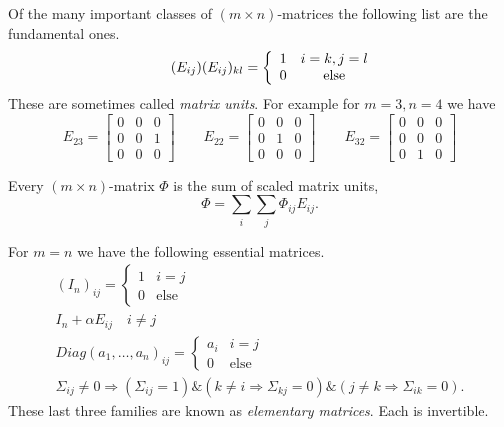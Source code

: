 \documentclass[12pt,twoside,dvipsnames,letterpaper]{memoir}
\begin{document}
Of the many important classes of $(m\times n)$-matrices the following list are the fundamental ones.
\begin{gather}
    \tag{$E_{ij}$}
    (E_{ij})_{kl}  = \left\{\begin{array}{cc}
        1 & i=k, j=l\\
        0 & \text{else}
    \end{array}\right.\\
\end{gather}
These are sometimes called \emph{matrix units}.
For example for $m=3,n=4$ we have
\[
    E_{23}=\begin{bmatrix} 0 & 0 & 0 \\ 0 & 0 & 1 \\ 0 & 0 & 0 \end{bmatrix}
    \qquad
    E_{22}=\begin{bmatrix} 0 & 0 & 0 \\ 0 & 1 & 0 \\ 0 & 0 & 0 \end{bmatrix}
    \qquad 
    E_{32}
    =\begin{bmatrix} 0 & 0 & 0 \\ 0 & 0 & 0 \\ 0 & 1 & 0 \end{bmatrix}
\]
\begin{proposition}
    Every $(m\times n)$-matrix $\Phi$ is the sum of scaled matrix units,
    \[
        \Phi = \sum_{i}\sum_j \Phi_{ij}E_{ij}.
    \]
\end{proposition}

For $m=n$ we have the following essential matrices.
\begin{gather}
    \tag{$I_n$}
    (I_n)_{ij} = \left\{\begin{array}{cc}
        1 & i=j\\
        0 & \text{else}
    \end{array}\right.\\
    \tag{Transvection}
    I_n+\alpha E_{ij}  \quad i\neq j\\
    \tag{Diagonal}
    Diag(a_1,\ldots,a_n)_{ij} = \left\{\begin{array}{cc}
        a_i & i=j\\
        0 & \text{else}
    \end{array}\right.\\
    \tag{Permutation}
    \Sigma_{ij}\neq 0  \Rightarrow (\Sigma_{ij}=1) \& (k\neq i\Rightarrow \Sigma_{kj}=0)
    \& (j\neq k\Rightarrow \Sigma_{ik}=0).
\end{gather}
These last three families are known as \emph{elementary matrices}.
Each is invertible.
\end{document}
